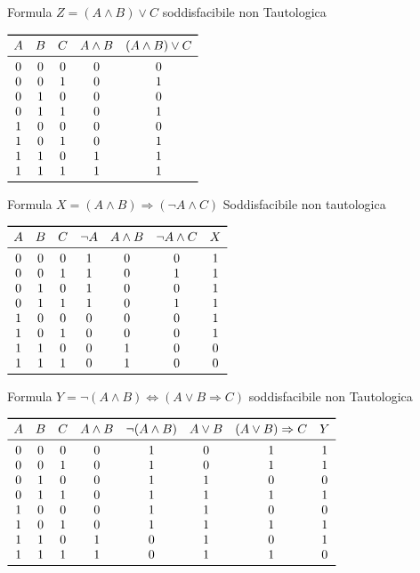 Formula $Z = (A \land B) \lor C$  soddisfacibile non Tautologica

$\begin{array}{ccccc}
\toprule A & B & C & A \land B & (A \land B) \lor C \\
\midrule
         0 & 0 & 0 & 0 & 0 \\
         0 & 0 & 1 & 0 & 1 \\
         0 & 1 & 0 & 0 & 0 \\
         0 & 1 & 1 & 0 & 1 \\
         1 & 0 & 0 & 0 & 0 \\
         1 & 0 & 1 & 0 & 1 \\
         1 & 1 & 0 & 1 & 1 \\
         1 & 1 & 1 & 1 & 1 \\
\bottomrule
\end{array}$\newline

Formula $X = (A \land B) \Rightarrow (\neg A \land C)$ \quad Soddisfacibile  non tautologica\newline

$\begin{array}{ccccccc}
\toprule A & B & C & \neg A & A \land B & \neg A \land C & X\\
\midrule
         0 & 0 & 0 & 1 & 0 & 0 & 1 \\
         0 & 0 & 1 & 1 & 0 & 1 & 1 \\
         0 & 1 & 0 & 1 & 0 & 0 & 1 \\
         0 & 1 & 1 & 1 & 0 & 1 & 1 \\
         1 & 0 & 0 & 0 & 0 & 0 & 1 \\
         1 & 0 & 1 & 0 & 0 & 0 & 1 \\
         1 & 1 & 0 & 0 & 1 & 0 & 0 \\
         1 & 1 & 1 & 0 & 1 & 0 & 0 \\
\bottomrule
\end{array}$ \newline

Formula $Y = \neg(A \land B) \iff (A \lor B \Rightarrow C)$ soddisfacibile non Tautologica

$\begin{array}{cccccccc}
\toprule
A & B & C & A \land B & \neg(A \land B) & A \lor B & (A \lor B) \Rightarrow C & Y \\
\midrule
0 & 0 & 0 & 0 & 1 & 0 & 1 & 1 \\
0 & 0 & 1 & 0 & 1 & 0 & 1 & 1 \\
0 & 1 & 0 & 0 & 1 & 1 & 0 & 0 \\
0 & 1 & 1 & 0 & 1 & 1 & 1 & 1 \\
1 & 0 & 0 & 0 & 1 & 1 & 0 & 0 \\
1 & 0 & 1 & 0 & 1 & 1 & 1 & 1 \\
1 & 1 & 0 & 1 & 0 & 1 & 0 & 1 \\
1 & 1 & 1 & 1 & 0 & 1 & 1 & 0 \\
\bottomrule
\end{array}$

